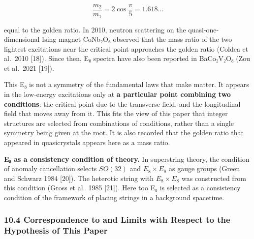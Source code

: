 \documentclass[
  a4paper,
]{article}
\begin{document}
\[
\frac{m_2}{m_1}=2\cos\frac{\pi}{5}=1.618\ldots
\tag{16}
\]

equal to the golden ratio. In 2010, neutron scattering on the
quasi-one-dimensional Ising magnet CoNb₂O₆ observed that the mass ratio
of the two lightest excitations near the critical point approaches the
golden ratio (Coldea et al.~2010 {[}18{]}). Since then, E₈ spectra have
also been reported in BaCo₂V₂O₈ (Zou et al.~2021 {[}19{]}).

This E₈ is not a symmetry of the fundamental laws that make matter. It
appears in the low-energy excitations only at \textbf{a particular point
combining two conditions}: the critical point due to the transverse
field, and the longitudinal field that moves away from it. This fits the
view of this paper that integer structures are selected from
combinations of conditions, rather than a single symmetry being given at
the root. It is also recorded that the golden ratio that appeared in
quasicrystals appears here as a mass ratio.

\textbf{E₈ as a consistency condition of theory.} In superstring theory,
the condition of anomaly cancellation selects \(SO(32)\) and
\(E_8\times E_8\) as gauge groups (Green and Schwarz 1984 {[}20{]}). The
heterotic string with \(E_8\times E_8\) was constructed from this
condition (Gross et al.~1985 {[}21{]}). Here too E₈ is selected as a
consistency condition of the framework of placing strings in a
background spacetime.

\subsubsection{10.4 Correspondence to and Limits with Respect to the
Hypothesis of This
Paper}\label{correspondence-to-and-limits-with-respect-to-the-hypothesis-of-this-paper}
\end{document}
